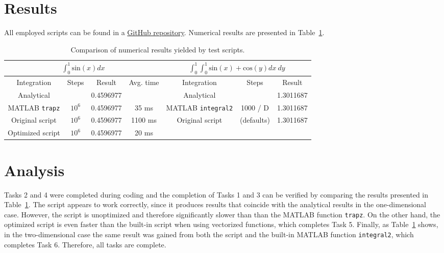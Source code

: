 \documentclass{article}
\begin{document}
	\section*{Results}
	All employed scripts can be found in a \href{https://github.com/VesaVilleHurskainen/cmim2018}{GitHub repository}. Numerical results are presented in Table~\ref{tab:results}.
	 \begin{table}[ht]
	 	\def\arraystretch{1.3}
		\begin{center}
			\begin{tabular}{|c|c|c|c||c|c|c|}
				\hline
				\multicolumn{4}{|c||}{$\int_{0}^{1} \textrm{sin}(x) dx$} & \multicolumn{3}{c|}{$\int_{0}^{1} \int_{0}^{1} \textrm{sin}(x) + \textrm{cos}(y) dx~dy$}\\
				\hline
				Integration                    & Steps  & Result    & Avg. time & Integration                        & Steps  & Result \\
				\hline
				Analytical                     &        & 0.4596977 &           & Analytical                &                    & 1.3011687 \\
				MATLAB \texttt{trapz} & $10^6$ & 0.4596977 & 35 ms               & MATLAB \texttt{integral2} & 1000 / D & 1.3011687 \\
				Original script                & $10^6$ & 0.4596977 & 1100 ms   & Original script           & (defaults) & 1.3011687 \\
				Optimized script               & $10^6$ & 0.4596977 & 20 ms &&&\\
				\hline
			\end{tabular}
			\caption{Comparison of numerical results yielded by test scripts.}
			\label{tab:results}
		\end{center}
	\end{table}
	\vspace{-1cm}

	\section*{Analysis}
	Tasks 2 and 4 were completed during coding and the completion of Tasks 1 and 3 can be verified by comparing the results presented in Table~\ref{tab:results}. The script appears to work correctly, since it produces results that coincide with the analytical results in the one-dimensional case. However, the script is unoptimized and therefore significantly slower than than the MATLAB function \texttt{trapz}. On the other hand, the optimized script is even faster than the built-in script when using vectorized functions, which completes Task 5. Finally, as Table~\ref{tab:results} shows, in the two-dimensional case the same result was gained from both the script and the built-in MATLAB function \texttt{integral2}, which completes Task 6. Therefore, all tasks are complete.\\
\end{document}
